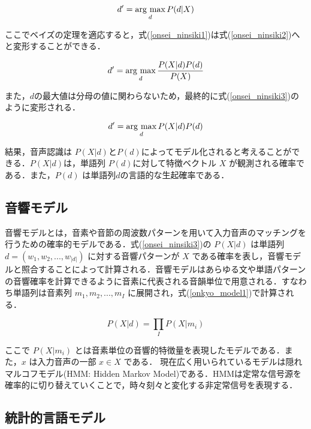\begin{equation}
    d' = \mathop{\rm arg~max}\limits_{d} P(d|X) 
    \label{onsei_ninsiki1}
\end{equation}

ここでベイズの定理を適応すると，式(\ref{onsei_ninsiki1})は式(\ref{onsei_ninsiki2})へと変形することができる．

\begin{equation}
    d' = \mathop{\rm arg~max}\limits_{d}  \frac{P(X|d)P(d)}{P(X)} 
    \label{onsei_ninsiki2}
\end{equation}

また，$d$の最大値は分母の値に関わらないため，最終的に式(\ref{onsei_ninsiki3})のように変形される．

\begin{equation}
    d' = \mathop{\rm arg~max}\limits_{d}  P(X|d)P(d) 
    \label{onsei_ninsiki3}
\end{equation}

結果，音声認識は $P(X|d)$と$P(d)$によってモデル化されると考えることができる．$P(X|d)$は，単語列 $P(d)$に対して特徴ベクトル $X$ が観測される確率である．また，$P(d)$ は単語列$d$の言語的な生起確率である．

\subsection{音響モデル}
音響モデルとは，音素や音節の周波数パターンを用いて入力音声のマッチングを行うための確率的モデルである．式(\ref{onsei_ninsiki3})の $P(X|d)$ は単語列 $d = (w_1, w_2, ..., w_{|d|})$ に対する音響パターンが $X$ である確率を表し，音響モデルと照合することによって計算される．音響モデルはあらゆる文や単語パターンの音響確率を計算できるように音素に代表される音韻単位で用意される．すなわち単語列は音素列 $m_1, m_2, ... , m_I $ に展開され，式(\ref{onkyo_model1})で計算される．

\begin{equation}
    P(X|d) = \prod_{I}  P(X|m_i) 
    \label{onkyo_model1}
\end{equation}

ここで $P(X|m_i)$ とは音素単位の音響的特徴量を表現したモデルである．また，$x$ は入力音声の一部 $x \in X$ である．
現在広く用いられているモデルは隠れマルコフモデル(HMM: Hidden Markov Model)である．HMMは定常な信号源を確率的に切り替えていくことで，時々刻々と変化する非定常信号を表現する．

\subsection{統計的言語モデル}

